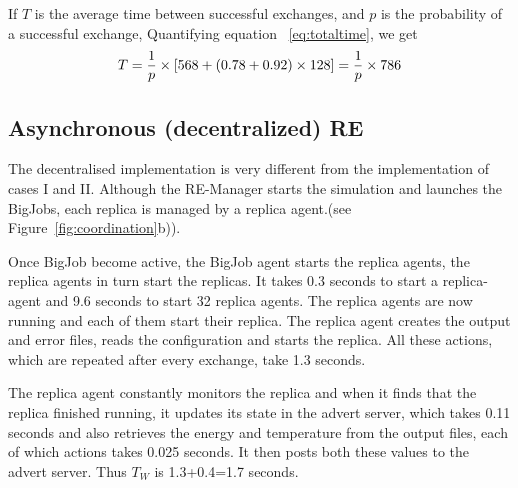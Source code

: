 \documentclass{rspublic}
\newcommand{\jhanote}[1]{ {\textcolor{red} { ***shantenu: #1 }}}
\newcommand{\jhanote}[1]{}
\begin{document}

If $T$ is the average time between successful exchanges, and $p$ is
the probability of a successful exchange, Quantifying equation
~\ref{eq:totaltime}, we get
\begin{eqnarray}
T=  {1 \over p} \times {[568 + (0.78 + 0.92)\times 128]} = {1 \over p} \times 786 
\label{eq:timebt}
\end{eqnarray}


\subsection{Asynchronous (decentralized) RE}

The decentralised implementation is very different from the
implementation of cases I and II. Although the RE-Manager starts the
simulation and launches the BigJobs, each replica is managed by a replica agent.(see
Figure~\ref{fig:coordination}b)). %

Once BigJob become active, the BigJob agent starts the replica agents, 
the replica agents in turn start the replicas. It takes 0.3 seconds to start a replica-agent and 9.6 seconds to start 32 replica agents. 
The replica agents are now
running and each of them start their replica. The replica agent creates the output
and error files, reads the configuration and starts the replica. All
these actions, which are repeated after every exchange, take 1.3
seconds.

The replica agent constantly monitors the replica and when it finds
that the replica finished running, it updates its state in the advert
server, which takes 0.11 seconds and also retrieves the energy and
temperature from the output files, each of which actions takes 0.025
seconds. It then posts both these values to the advert server. Thus
$T_W$ is 1.3+0.4=1.7 seconds.
\end{document}
